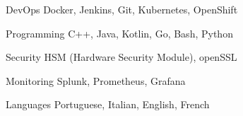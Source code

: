 

\begin{cvskills}

  \cvskill
    {DevOps} %
    {Docker, Jenkins, Git, Kubernetes, OpenShift} %

  \cvskill
    {Programming} %
    {C++, Java, Kotlin, Go, Bash, Python} %

  \cvskill
    {Security} %
    {HSM (Hardware Security Module), openSSL} %

  \cvskill
    {Monitoring} %
    {Splunk, Prometheus, Grafana} %

  \cvskill
    {Languages} %
    {Portuguese, Italian, English, French} %

\end{cvskills}
